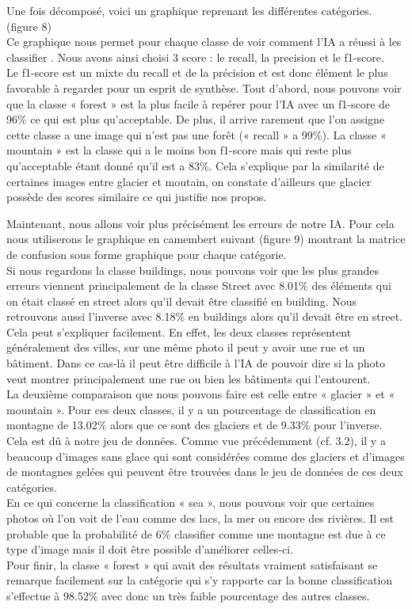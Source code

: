 \documentclass[12pt ,a4paper ]{article}
\begin{document}
\begin{multicols}{2}
Une fois décomposé, voici un graphique reprenant les différentes catégories. (figure 8)\\

Ce graphique nous permet pour chaque classe de voir comment l’IA a réussi à les classifier . Nous avons ainsi choisi 3 score : le recall, la precision et le f1-score.\\
Le f1-score est un mixte du recall et de la précision et est donc élément le plus favorable à regarder pour un esprit de synthèse.
Tout d’abord, nous pouvons voir que la classe « forest » est la plus facile à repérer pour l’IA avec un f1-score de 96\% ce qui est plus qu'acceptable. De plus, il arrive rarement que l’on assigne cette classe a une image qui n’est pas une forêt (« recall » a 99\%).
La classe « mountain » est la classe qui a le moins bon f1-score mais qui reste plus qu’acceptable étant donné qu’il est a 83\%. Cela s'explique par la similarité de certaines images entre glacier et moutain, on constate d'ailleurs que glacier possède des scores similaire ce qui justifie nos propos. 

Maintenant, nous allons voir plus précisément les erreurs de notre IA. Pour cela nous utiliserons le graphique en camembert suivant (figure 9) montrant la matrice de confusion sous forme graphique pour chaque catégorie.\\

Si nous regardons la classe buildings, nous pouvons voir que les plus grandes erreurs viennent principalement de la classe Street avec 8.01\% des éléments qui on était classé en street alors qu’il devait être classifié en building. Nous retrouvons aussi l’inverse avec 8.18\% en buildings alors qu’il devait être en street. Cela peut s’expliquer facilement. En effet, les deux classes représentent généralement des villes, sur une même photo il peut y avoir une rue et un bâtiment. Dans ce cas-là il peut être difficile à l’IA de pouvoir dire si la photo veut montrer principalement une rue ou bien les bâtiments qui l’entourent.\\
La deuxième comparaison que nous pouvons faire est celle entre « glacier » et « mountain ». Pour ces deux classes, il y a un pourcentage de classification en montagne de 13.02\% alors que ce sont des glaciers et de 9.33\% pour l’inverse. Cela est dû à notre jeu de données. Comme vue précédemment (cf. 3.2), il y a beaucoup d’images sans glace qui sont considérées comme des glaciers et d’images de montagnes gelées qui peuvent être trouvées dans le jeu de données de ces deux catégories.\\
En ce qui concerne la classification « sea », nous pouvons voir que certaines photos où l’on voit de l’eau comme des lacs, la mer ou encore des rivières. Il est probable que la probabilité de 6\% classifier comme une montagne est due à ce type d’image mais il doit être possible d’améliorer celles-ci.\\
Pour finir, la classe « forest » qui avait des résultats vraiment satisfaisant se remarque facilement sur la catégorie qui s'y rapporte car la bonne classification s'effectue à 98.52\% avec donc un très faible pourcentage des autres classes. 

\end{multicols}
\end{document}
